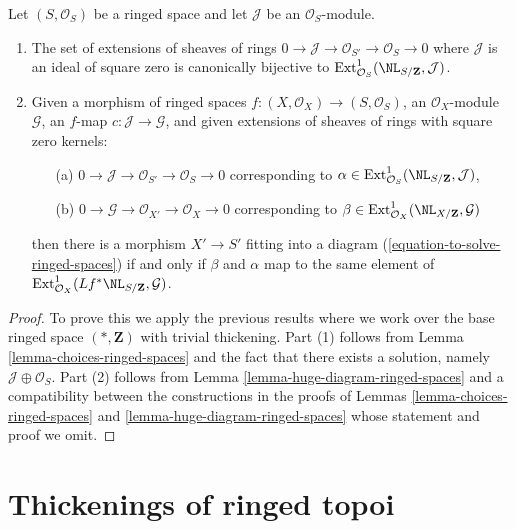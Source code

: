 \begin{lemma}
\label{lemma-extensions-of-ringed-spaces}
Let $(S, \mathcal{O}_S)$ be a ringed space and let $\mathcal{J}$
be an $\mathcal{O}_S$-module.
\begin{enumerate}
\item The set of extensions of sheaves of rings
$0 \to \mathcal{J} \to \mathcal{O}_{S'} \to \mathcal{O}_S \to 0$
where $\mathcal{J}$ is an ideal of square zero is canonically bijective to
$\text{Ext}^1_{\mathcal{O}_S}(\NL_{S/\mathbf{Z}}, \mathcal{J})$.
\item Given a morphism of ringed spaces
$f : (X, \mathcal{O}_X) \to (S, \mathcal{O}_S)$, an $\mathcal{O}_X$-module
$\mathcal{G}$, an $f$-map $c : \mathcal{J} \to \mathcal{G}$, and
given extensions of sheaves of rings with square zero kernels:
\begin{enumerate}
\item[(a)] $0 \to \mathcal{J} \to \mathcal{O}_{S'} \to \mathcal{O}_S \to 0$
corresponding to
$\alpha \in \text{Ext}^1_{\mathcal{O}_S}(\NL_{S/\mathbf{Z}}, \mathcal{J})$,
\item[(b)] $0 \to \mathcal{G} \to \mathcal{O}_{X'} \to \mathcal{O}_X \to 0$
corresponding to
$\beta \in \text{Ext}^1_{\mathcal{O}_X}(\NL_{X/\mathbf{Z}}, \mathcal{G})$
\end{enumerate}
then there is a morphism $X' \to S'$ fitting into a diagram
(\ref{equation-to-solve-ringed-spaces}) if and only if $\beta$ and $\alpha$
map to the same element of
$\text{Ext}^1_{\mathcal{O}_X}(Lf^*\NL_{S/\mathbf{Z}}, \mathcal{G})$.
\end{enumerate}
\end{lemma}

\begin{proof}
To prove this we apply the previous results where we work over
the base ringed space $(*, \mathbf{Z})$ with trivial thickening.
Part (1) follows from Lemma \ref{lemma-choices-ringed-spaces}
and the fact that there exists a solution, namely
$\mathcal{J} \oplus \mathcal{O}_S$.
Part (2) follows from Lemma \ref{lemma-huge-diagram-ringed-spaces}
and a compatibility between the constructions in the proofs
of Lemmas \ref{lemma-choices-ringed-spaces} and
\ref{lemma-huge-diagram-ringed-spaces}
whose statement and proof we omit.
\end{proof}









\section{Thickenings of ringed topoi}
\label{section-thickenings-ringed-topoi}

